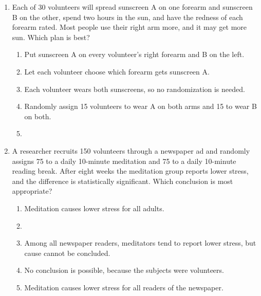 \documentclass[12pt]{article}
\begin{document}
\begin{enumerate}[leftmargin=1.9em, itemsep=0.13in]
  \boxguard[15]
  \item Each of 30 volunteers will spread sunscreen A on one forearm and sunscreen B on the
        other, spend two hours in the sun, and have the redness of each forearm rated. Most
        people use their right arm more, and it may get more sun. Which plan is best?
        \begin{enumerate}[label=\textbf{(\Alph*)}, leftmargin=2.2em, itemsep=2pt]
          \item Put sunscreen A on every volunteer's right forearm and B on the left.
          \item Let each volunteer choose which forearm gets sunscreen A.
          \item Each volunteer wears both sunscreens, so no randomization is needed.
          \item Randomly assign 15 volunteers to wear A on both arms and 15 to wear B on both.
          \item {}\hfill{}\rule[-0.2in]{0pt}{0.48in}
        \end{enumerate}

  \boxguard[15]
  \item A researcher recruits 150 volunteers through a newspaper ad and randomly assigns 75 to a
        daily 10-minute meditation and 75 to a daily 10-minute reading break. After eight weeks
        the meditation group reports lower stress, and the difference is statistically
        significant. Which conclusion is most appropriate?
        \begin{enumerate}[label=\textbf{(\Alph*)}, leftmargin=2.2em, itemsep=2pt]
          \item Meditation causes lower stress for all adults.
          \item {}
          \item Among all newspaper readers, meditators tend to report lower stress, but cause
                cannot be concluded.
          \item No conclusion is possible, because the subjects were volunteers.
          \item Meditation causes lower stress for all readers of the newspaper.\hfill{}\rule[-0.2in]{0pt}{0.48in}
        \end{enumerate}

\end{enumerate}
\end{document}
